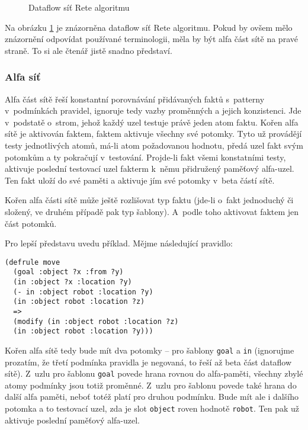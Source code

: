 \begin{figure}[h]
\centerline{}
\caption{Dataflow síť Rete algoritmu\cite{rete}}
\label{network}
\end{figure}

Na obrázku \ref{network} je znázorněna dataflow síť Rete algoritmu.
Pokud by ovšem mělo znázornění odpovídat používané terminologii, měla
by být alfa část sítě na pravé straně. To si ale čtenář jistě snadno
představí.
\subsubsection{Alfa síť}
Alfa část sítě řeší konstantní porovnávání přidávaných faktů s~patterny
v~podmínkách pravidel, ignoruje tedy vazby proměnných a jejich konzistenci.
Jde v~podstatě o~strom, jehož každý uzel testuje právě jeden atom faktu.
Kořen alfa sítě je aktivován faktem, faktem aktivuje všechny své potomky.
Tyto už provádějí testy jednotlivých atomů, má-li atom požadovanou hodnotu,
předá uzel fakt svým potomkům a ty pokračují v~testování. Projde-li fakt
všemi konstatními testy, aktivuje poslední testovací uzel fakterm k~němu
přidružený paměťový alfa-uzel. Ten fakt uloží do své paměti a aktivuje
jím své potomky v~beta částí sítě.

Kořen alfa části sítě může ještě rozlišovat typ faktu (jde-li o~fakt
jednoduchý či složený, ve druhém případě pak typ šablony). A~podle toho
aktivovat faktem jen část potomků.

Pro lepší představu uvedu příklad. Mějme následující pravidlo:
\begin{verbatim}
(defrule move
  (goal :object ?x :from ?y)
  (in :object ?x :location ?y)
  (- in :object robot :location ?y)
  (in :object robot :location ?z)
  =>
  (modify (in :object robot :location ?z)
  (in :object robot :location ?y)))
\end{verbatim}
Kořen alfa sítě tedy bude mít dva potomky -- pro šablony \verb|goal|
a \verb|in| (ignorujme prozatím, že třetí podmínka pravidla je negovaná,
to řeší až beta část dataflow sítě). Z~uzlu pro šablonu \verb|goal|
povede hrana rovnou do alfa-paměti, všechny zbylé atomy podmínky jsou
totiž proměnné. Z~uzlu pro šablonu povede také hrana do další alfa
paměti, neboť totéž platí pro druhou podmínku. Bude mít ale i dalšího
potomka a to testovací uzel, zda je slot \verb|object| roven hodnotě
\verb|robot|. Ten pak už aktivuje poslední paměťový alfa-uzel.

